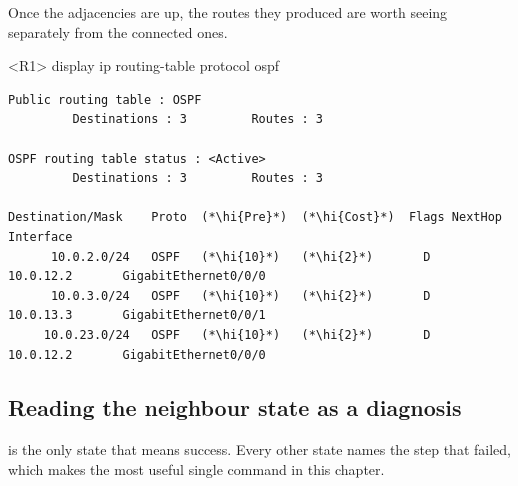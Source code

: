Once the adjacencies are up, the routes they produced are worth seeing
separately from the connected ones.

\begin{vrpbox}{<R1> display ip routing-table protocol ospf}
\begin{lstlisting}[style=dcnvrp]
Public routing table : OSPF
         Destinations : 3         Routes : 3

OSPF routing table status : <Active>
         Destinations : 3         Routes : 3

Destination/Mask    Proto  (*\hi{Pre}*)  (*\hi{Cost}*)  Flags NextHop         Interface
      10.0.2.0/24   OSPF   (*\hi{10}*)   (*\hi{2}*)       D   10.0.12.2       GigabitEthernet0/0/0
      10.0.3.0/24   OSPF   (*\hi{10}*)   (*\hi{2}*)       D   10.0.13.3       GigabitEthernet0/0/1
     10.0.23.0/24   OSPF   (*\hi{10}*)   (*\hi{2}*)       D   10.0.12.2       GigabitEthernet0/0/0
\end{lstlisting}
\end{vrpbox}

\subsection{Reading the neighbour state as a diagnosis}
 is the only state that means success. Every other state names
the step that failed, which makes  the most
useful single command in this chapter.


